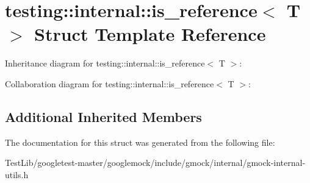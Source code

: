 \hypertarget{structtesting_1_1internal_1_1is__reference}{}\section{testing\+:\+:internal\+:\+:is\+\_\+reference$<$ T $>$ Struct Template Reference}
\label{structtesting_1_1internal_1_1is__reference}


Inheritance diagram for testing\+:\+:internal\+:\+:is\+\_\+reference$<$ T $>$\+:


Collaboration diagram for testing\+:\+:internal\+:\+:is\+\_\+reference$<$ T $>$\+:
\subsection*{Additional Inherited Members}


The documentation for this struct was generated from the following file\+:\begin{DoxyCompactItemize}
\item 
Test\+Lib/googletest-\/master/googlemock/include/gmock/internal/gmock-\/internal-\/utils.\+h\end{DoxyCompactItemize}
